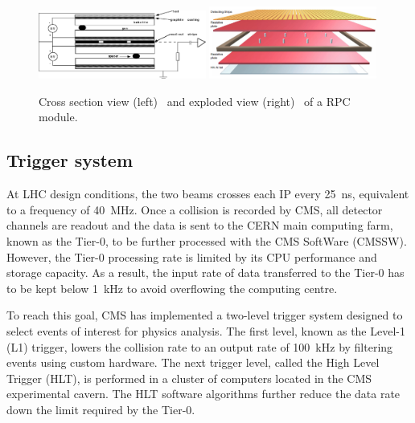 \begin{figure}[!htbp]
 \begin{center}
  \includegraphics[width=0.49\textwidth]{Figures/Experiment/CMS/RPC_1.png}
  \includegraphics[width=0.49\textwidth]{Figures/Experiment/CMS/RPC_2.png}
 \end{center}
 \caption{Cross section view (left)~\cite{CMSMuonRPCFig_1} and exploded view (right)~\cite{CMSMuonRPCFig_2} of a RPC module. }
 \label{fig:CMS_RPC}
\end{figure}



\subsection{Trigger system}

At LHC design conditions, the two beams crosses each IP every \SI{25}{\ns}, equivalent to a frequency of \SI{40}{\MHz}. Once a collision is recorded by CMS, all detector channels are readout and the data is sent to the CERN main computing farm, known as the Tier-0, to be further processed with the CMS SoftWare (CMSSW). However, the Tier-0 processing rate is limited by its CPU performance and storage capacity. As a result, the input rate of data transferred to the Tier-0 has to be kept below \SI{1}{\kHz} to avoid overflowing the computing centre.

To reach this goal, CMS has implemented a two-level trigger system designed to select events of interest for physics analysis. The first level, known as the Level-1 (L1) trigger, lowers the collision rate to an output rate of \SI{100}{\kHz} by filtering events using custom hardware. The next trigger level, called the High Level Trigger (HLT), is performed in a cluster of computers located in the CMS experimental cavern. The HLT software algorithms further reduce the data rate down the limit required by the Tier-0.

